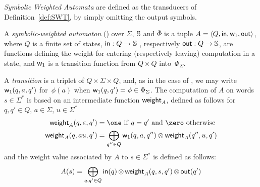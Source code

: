 \noindent
 \emph{Symbolic Weighted Automata} %
are defined  as the transducers of Definition~\ref{def:SWT},
by simply omitting the output symbols.
%
%
\begin{definition} \label{def:SWA}
A \emph{symbolic-weighted automaton} (\SWA)
over $\Sigma$, $\mathbb{S}$ and $\bar\Phi$
is a tuple
$A = \< Q, \init, {\wei_1}, \final >$,
where $Q$ is a finite set of states,
$\mathsf{in} : Q \to \mathbb{S}$ %
, respectively $\mathsf{out} : Q \to \mathbb{S}$,  %
are functions defining the weight for entering
(respectively leaving) computation in a state,
and ${\mathsf{w}_1}$ is a transition function
from $Q \times Q$ into~$\Phi_{\Sigma}$.
\end{definition}
%
\noindent
A \SWA \emph{transition} is a triplet of $Q \times \Sigma \times Q$, 
and, as in the case of \SWT,
we may write $\mathsf{w}_1(q, a, q')$ for~$\phi(a)$
when $\mathsf{w}_1(q, q') = \phi \in \Phi_\Sigma$.
The computation of $A$ on words $s \in \Sigma^*$
is based on an intermediate function $\mathsf{weight}_A$,
defined as follows for $q, q' \in Q$, $a \in \Sigma$, $u \in \Sigma^*$
%
\begin{align}
\weight_A(q, \varepsilon, q') & = \one\ \mathrm{if}\  q = q'\ 
          \mathrm{and}\  \zero\  \mathrm{otherwise}\\
\weight_A(q, au, q') & =  \displaystyle\bigoplus_{q'' \in Q}
    \wei_{1}(q, a, q'') \otimes \weight_A(q'', u, q')\nonumber
\label{eq:SWA-weight}
\end{align}
%
\noindent
and the weight value associated by $A$ to
$s \in \Sigma^*$ is defined as follows: %
\begin{equation}
A(s)  =
\displaystyle\bigoplus_{q, q' \in Q} \mathsf{in}(q)
\mathop{\otimes} \mathsf{weight}_A(q, s, q') \mathop{\otimes} \mathsf{out}(q')
\label{eq:SWA-value}
\end{equation}


%

